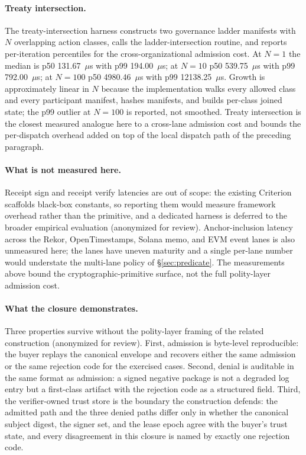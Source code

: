 \paragraph{Treaty intersection.} The treaty-intersection harness constructs two governance ladder manifests with $N$ overlapping action classes, calls the ladder-intersection routine, and reports per-iteration percentiles for the cross-organizational admission cost. At $N{=}1$ the median is p50 131.67~$\mu$s with p99 194.00~$\mu$s; at $N{=}10$ p50 539.75~$\mu$s with p99 792.00~$\mu$s; at $N{=}100$ p50 4980.46~$\mu$s with p99 12138.25~$\mu$s. Growth is approximately linear in $N$ because the implementation walks every allowed class and every participant manifest, hashes manifests, and builds per-class joined state; the p99 outlier at $N{=}100$ is reported, not smoothed. Treaty intersection is the closest measured analogue here to a cross-lane admission cost and bounds the per-dispatch overhead added on top of the local dispatch path of the preceding paragraph.

\paragraph{What is not measured here.} Receipt sign and receipt verify latencies are out of scope: the existing Criterion scaffolds black-box constants, so reporting them would measure framework overhead rather than the primitive, and a dedicated harness is deferred to the broader empirical evaluation (anonymized for review). Anchor-inclusion latency across the Rekor, OpenTimestamps, Solana memo, and EVM event lanes is also unmeasured here; the lanes have uneven maturity and a single per-lane number would understate the multi-lane policy of \S\ref{sec:predicate}. The measurements above bound the cryptographic-primitive surface, not the full polity-layer admission cost.

\paragraph{What the closure demonstrates.} Three properties survive without the polity-layer framing of the related construction (anonymized for review). First, admission is byte-level reproducible: the buyer replays the canonical envelope and recovers either the same admission or the same rejection code for the exercised cases. Second, denial is auditable in the same format as admission: a signed negative package is not a degraded log entry but a first-class artifact with the rejection code as a structured field. Third, the verifier-owned trust store is the boundary the construction defends: the admitted path and the three denied paths differ only in whether the canonical subject digest, the signer set, and the lease epoch agree with the buyer's trust state, and every disagreement in this closure is named by exactly one rejection code.
